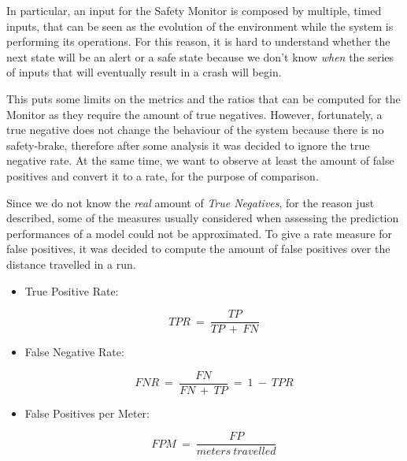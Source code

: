 In particular, an input for the Safety Monitor is composed by multiple, timed inputs, that can be seen as the evolution of the environment while the system is performing its operations. For this reason, it is hard to understand whether the next state will be an alert or a safe state because we don't know \textsl{when} the series of inputs that will eventually result in a crash will begin.

This puts some limits on the metrics and the ratios that can be computed for the Monitor as they require the amount of true negatives. However, fortunately, a true negative does not change the behaviour of the system because there is no safety-brake, therefore after some analysis it was decided to ignore the true negative rate. At the same time, we want to observe at least the amount of false positives and convert it to a rate, for the purpose of comparison.\newline

Since we do not know the \textsl{real} amount of \textsl{True Negatives}, for the reason just described, some of the measures usually considered when assessing the prediction performances of a model could not be approximated. To give a rate measure for false positives, it was decided to compute the amount of false positives over the distance travelled in a run.

\begin{itemize}
	\item True Positive Rate:
	\vspace{-0.5cm}
	\begin{center}
		\begin{equation}
		TPR\: =\: \frac{TP}{TP\: +\: FN}
		\end{equation}
	\end{center}
	\item False Negative Rate:
	\vspace{-0.5cm}
	\begin{center}
		\begin{equation}
		FNR\: =\: \frac{FN}{FN\: +\: TP}\: =\: 1\: -\: TPR
		\end{equation}
	\end{center}
	\item False Positives per Meter:
	\vspace{-0.5cm}
	\begin{center}
		\begin{equation}
		FPM\: =\: \frac{FP}{meters\: travelled}
		\end{equation}
	\end{center}
\end{itemize}

